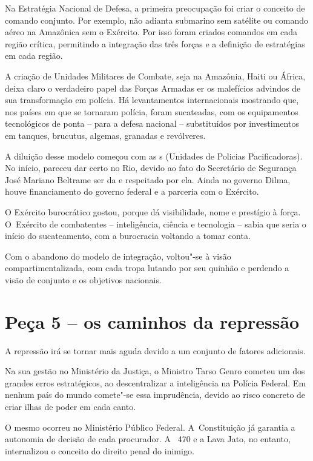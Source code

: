 Na Estratégia Nacional de Defesa, a primeira preocupação foi criar o
conceito de comando conjunto. Por exemplo, não adianta submarino sem
satélite ou comando aéreo na Amazônica sem o Exército. Por isso foram
criados comandos em cada região crítica, permitindo a integração das
três forças e a definição de estratégias em cada região.

A criação de Unidades Militares de Combate, seja na Amazônia, Haiti ou
África, deixa claro o verdadeiro papel das Forças Armadas er os
malefícios advindos de sua transformação em polícia. Há levantamentos
internacionais mostrando que, nos países em que se tornaram polícia,
foram sucateadas, com os equipamentos tecnológicos de ponta -- para a
defesa nacional -- substituídos por investimentos em tanques, brucutus,
algemas, granadas e revólveres.

A diluição desse modelo começou com as s (Unidades de Policias
Pacificadoras). No início, pareceu dar certo no Rio, devido ao fato do
Secretário de Segurança José Mariano Beltrame ser da  e respeitado por
ela. Ainda no governo Dilma, houve financiamento do governo federal e a
parceria com o Exército.

O Exército burocrático gostou, porque dá visibilidade, nome e prestígio
à força. O~Exército de combatentes -- inteligência, ciência e tecnologia
-- sabia que seria o início do sucateamento, com a burocracia voltando a
tomar conta.

Com o abandono do modelo de integração, voltou"-se à visão
compartimentalizada, com cada tropa lutando por seu quinhão e perdendo a
visão de conjunto e os objetivos nacionais.

\section{Peça 5 -- os caminhos da repressão}

A repressão irá se tornar mais aguda devido a um conjunto de fatores
adicionais.

Na sua gestão no Ministério da Justiça, o Ministro Tarso Genro cometeu
um dos grandes erros estratégicos, ao descentralizar a inteligência na
Polícia Federal. Em nenhum país do mundo comete"-se essa imprudência,
devido ao risco concreto de criar ilhas de poder em cada canto.

O mesmo ocorreu no Ministério Público Federal. A~Constituição já
garantia a autonomia de decisão de cada procurador. A~ 470 e a Lava
Jato, no entanto, internalizou o conceito do direito penal do inimigo.

